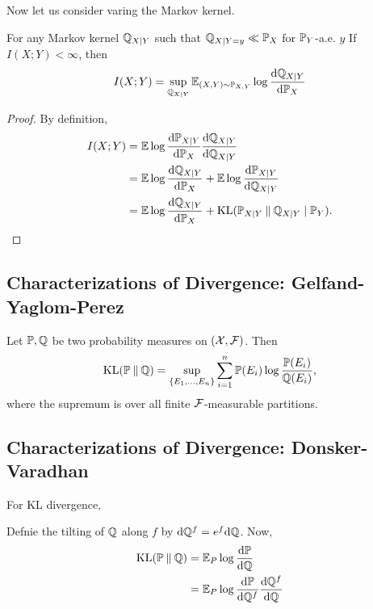 Now let us consider varing the Markov kernel.
\begin{proposition}
    For any Markov kernel $\mathbb{Q}_{X|Y}$ such that $\mathbb{Q}_{X|Y=y}\ll \mathbb{P}_X$ for $\mathbb{P}_Y$-a.e. $y$ 
    If $I(X;Y)<\infty$, then 
    \begin{equation}\label{eq:mutual-information-supremum-characterization}
        I(X;Y)=\sup_{\mathbb{Q}_{X|Y}}\mathbb{E}_{(X,Y)\sim \mathbb{P}_{X,Y}}\log \frac{\mathrm{d} \mathbb{Q}_{X|Y}}{\mathrm{d} \mathbb{P}_X}
    \end{equation}
\end{proposition}
\begin{proof}
    By definition,
    \begin{align*}
        I(X;Y)&=\mathbb{E}\log\frac{\mathrm{d}\mathbb{P}_{X|Y}}{\mathrm{d}\mathbb{P}_X}\frac{\mathrm{d}\mathbb{Q}_{X|Y}}{\mathrm{d}\mathbb{Q}_{X|Y}}\\
        &=\mathbb{E}\log\frac{\mathrm{d}\mathbb{Q}_{X|Y}}{\mathrm{d}\mathbb{P}_X}+\mathbb{E}\log\frac{\mathrm{d}\mathbb{P}_{X|Y}}{\mathrm{d}\mathbb{Q}_{X|Y}}\\
        &=\mathbb{E}\log\frac{\mathrm{d}\mathbb{Q}_{X|Y}}{\mathrm{d}\mathbb{P}_X}+\operatorname{KL}(\mathbb{P}_{X|Y}\mathbin{\|}\mathbb{Q}_{X|Y}\mid\mathbb{P}_Y).
    \end{align*}
    $$$$
\end{proof}



\subsection{Characterizations of Divergence: Gelfand-Yaglom-Perez}
\begin{theorem}
    Let $\mathbb{P},\mathbb{Q}$ be two probability measures on $(\mathcal{X},\mathcal{F})$.
    Then 
    \[\operatorname{KL}(\mathbb{P}\mathbin{\|}\mathbb{Q})=\sup_{\{E_1,\dots,E_n\}}\sum_{i=1}^{n}\mathbb{P}(E_i)\log\frac{\mathbb{P}(E_i)}{\mathbb{Q}(E_i)},\]
    where the supremum is over all finite $\mathcal{F}$-measurable partitions.
\end{theorem}

\subsection{Characterizations of Divergence: Donsker-Varadhan}

For KL divergence, 

Defnie the tilting of $\mathbb{Q}$ along $f$ by $\mathrm{d}{\mathbb{Q}^f}=e^f\mathrm{d}{\mathbb{Q}}$.
Now,
\begin{align*}
    \operatorname{KL}(\mathbb{P}\mathbin{\|}\mathbb{Q})&=\mathbb{E}_P \log \frac{\mathrm{d}{\mathbb{P}}}{\mathrm{d}{\mathbb{Q}}}\\
    &=\mathbb{E}_P \log \frac{\mathrm{d}{\mathbb{P}}}{\mathrm{d}{\mathbb{Q}^f}}\frac{\mathrm{d}{\mathbb{Q}^f}}{\mathrm{d}{\mathbb{Q}}}
\end{align*}

\begin{theorem}
    \[\]
\end{theorem}

